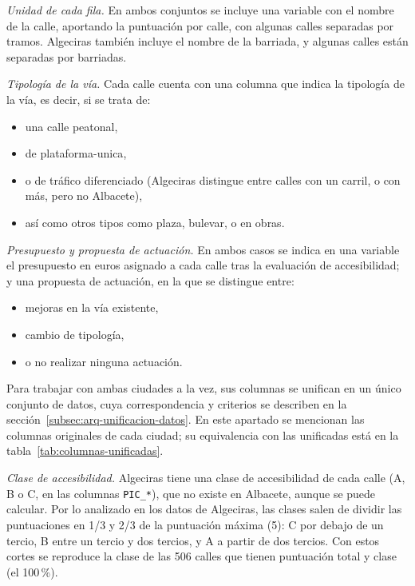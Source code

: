 \medskip
\noindent\textit{Unidad de cada fila.} En ambos conjuntos se incluye una variable con el nombre de la calle, aportando la puntuación por calle, con algunas calles separadas por tramos. Algeciras también incluye el nombre de la barriada, y algunas calles están separadas por barriadas.

\medskip
\noindent\textit{Tipología de la vía.} Cada calle cuenta con una columna que indica la tipología de la vía, es decir, si se trata de:
\begin{itemize}
  \item una calle peatonal,
  \item de \gls{plataforma-unica},
  \item o de tráfico diferenciado (Algeciras distingue entre calles con un carril, o con más, pero no Albacete),
  \item así como otros tipos como plaza, bulevar, o en obras.
\end{itemize}

\medskip
\noindent\textit{Presupuesto y propuesta de actuación.} En ambos casos se indica en una variable el presupuesto en euros asignado a cada calle tras la evaluación de accesibilidad; y una propuesta de actuación, en la que se distingue entre:
\begin{itemize}
  \item mejoras en la vía existente,
  \item cambio de tipología,
  \item o no realizar ninguna actuación.
\end{itemize}

Para trabajar con ambas ciudades a la vez, sus columnas se unifican en un único conjunto de datos, cuya correspondencia y criterios se describen en la sección~\ref{subsec:arq-unificacion-datos}. En este apartado se mencionan las columnas originales de cada ciudad; su equivalencia con las unificadas está en la tabla~\ref{tab:columnas-unificadas}.

\noindent\textit{Clase de accesibilidad.} Algeciras tiene una clase de accesibilidad de cada calle (A, B o C, en las columnas \texttt{PIC\_*}), que no existe en Albacete, aunque se puede calcular. Por lo analizado en los datos de Algeciras, las clases salen de dividir las puntuaciones en 1/3 y 2/3 de la puntuación máxima (5): C por debajo de un tercio, B entre un tercio y dos tercios, y A a partir de dos tercios. Con estos cortes se reproduce la clase de las 506 calles que tienen puntuación total y clase (el 100\,\%).
\\

